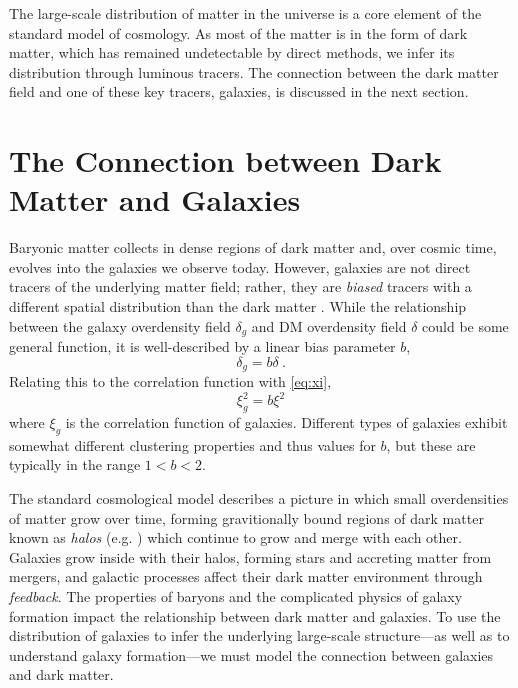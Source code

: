 The large-scale distribution of matter in the universe is a core element of the standard model of cosmology.
As most of the matter is in the form of dark matter, which has remained undetectable by direct methods, we infer its distribution through luminous tracers.
The connection between the dark matter field and one of these key tracers, galaxies, is discussed in the next section.


\section{The Connection between Dark Matter and Galaxies}

Baryonic matter collects in dense regions of dark matter and, over cosmic time, evolves into the galaxies we observe today.
However, galaxies are not direct tracers of the underlying matter field; rather, they are \emph{biased} tracers with a different spatial distribution than the dark matter \citep{kaiser_spatial_1984}.
While the relationship between the galaxy overdensity field $\delta_g$ and DM overdensity field $\delta$ could be some general function, it is well-described by a linear bias parameter $b$,
\begin{equation}
    \delta_g = b \delta ~.
\end{equation}
Relating this to the correlation function with \eqref{eq:xi}, 
\begin{equation}
    \xi_g^2 = b \xi^2
\end{equation}
where $\xi_g$ is the correlation function of galaxies.
Different types of galaxies exhibit somewhat different clustering properties and thus values for $b$, but these are typically in the range $1<b<2$.

The standard cosmological model describes a picture in which small overdensities of matter grow over time, forming gravitionally bound regions of dark matter known as \emph{halos} (e.g. \citealt{bryan_statistical_1998}) which continue to grow and merge with each other.
Galaxies grow inside with their halos, forming stars and accreting matter from mergers, and galactic processes affect their dark matter environment through \emph{feedback}.
The properties of baryons and the complicated physics of galaxy formation impact the relationship between dark matter and galaxies.
To use the distribution of galaxies to infer the underlying large-scale structure---as well as to understand galaxy formation---we must model the connection between galaxies and dark matter.

